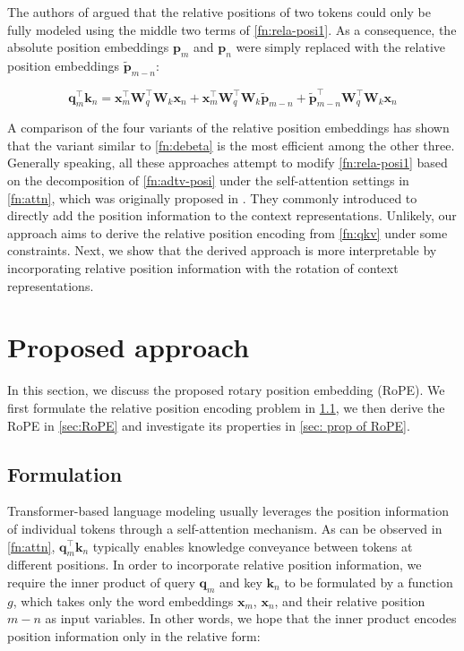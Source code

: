 The authors of \cite{He2020DeBERTaDB} argued that the relative positions of two tokens could only be fully modeled using the middle two terms of \ref{fn:rela-posi1}. As a consequence, the absolute position embeddings ${\boldsymbol p}_m$ and ${\boldsymbol p}_n$ were simply replaced with the relative position embeddings $\tilde{{\boldsymbol p}}_{m-n}$:

\begin{equation}
	{\boldsymbol q}_m^{\intercal}{\boldsymbol k}_n={\boldsymbol x}_m^{\intercal}{\boldsymbol W}_q^{\intercal}{\boldsymbol W}_k{\boldsymbol x}_n+{\boldsymbol x}_m^{\intercal}{\boldsymbol W}_q^{\intercal}{\boldsymbol W}_k\tilde{{\boldsymbol p}}_{m-n}+\tilde{{\boldsymbol p}}_{m-n}^{\intercal}{\boldsymbol W}_q^{\intercal}{\boldsymbol W}_k{\boldsymbol x}_n
	\label{fn:debeta}
\end{equation}

A comparison of the four variants of the relative position embeddings \cite{Radford2018ImprovingLU:2018} has shown that the variant similar to \ref{fn:debeta} is the most efficient among the other three. Generally speaking, all these approaches attempt to  modify \ref{fn:rela-posi1} based on the decomposition of \ref{fn:adtv-posi} under the self-attention settings in \ref{fn:attn}, which was originally proposed in \cite{Vaswani:2017}. They commonly introduced to directly add the position information to the context representations. Unlikely, our approach aims to derive the relative position encoding from \ref{fn:qkv} under some constraints. Next, we show that the derived approach is more interpretable by incorporating relative position information with the rotation of context representations. 
\section{Proposed approach}
\label{sec:approach}
In this section, we discuss the proposed rotary position embedding (RoPE). We first formulate the relative position encoding problem in  \ref{sec:formulation}, we then derive the RoPE in \ref{sec:RoPE} and investigate its properties in  \ref{sec: prop of RoPE}. 

\subsection{Formulation}
\label{sec:formulation}
Transformer-based language modeling usually leverages the position information of individual tokens through a self-attention mechanism. As can be observed in \ref{fn:attn}, ${\boldsymbol q}_m^{\intercal}{\boldsymbol k}_n$ typically enables knowledge conveyance between tokens at different positions. In order to incorporate relative position information, we require the inner product of query ${\boldsymbol q}_m$ and key ${\boldsymbol k}_n$ to be formulated by a function $g$, which takes only the word embeddings ${\boldsymbol x}_m$, ${\boldsymbol x}_n$, and their relative position $m -n$ as input variables. In other words, we hope that the inner product encodes position information only in the relative form:

